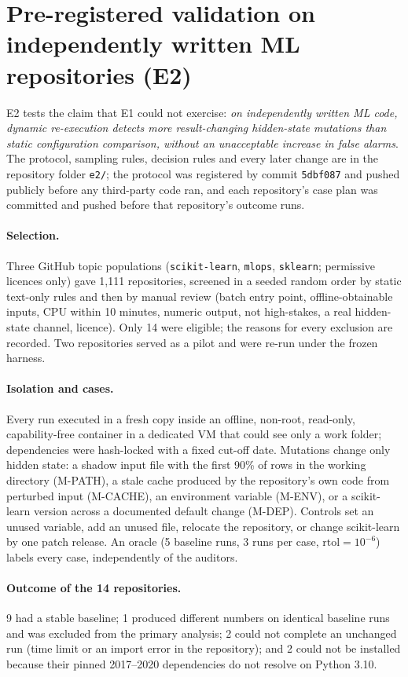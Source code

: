 
\section{Pre-registered validation on independently written ML repositories (E2)}
\label{sec:e2}
E2 tests the claim that E1 could not exercise: \emph{on independently written ML code, dynamic re-execution detects more result-changing hidden-state mutations than static configuration comparison, without an unacceptable increase in false alarms}. The protocol, sampling rules, decision rules and every later change are in the repository folder \texttt{e2/}; the protocol was registered by commit \texttt{5dbf087} and pushed publicly before any third-party code ran, and each repository's case plan was committed and pushed before that repository's outcome runs.

\paragraph{Selection.} Three GitHub topic populations (\texttt{scikit-learn}, \texttt{mlops}, \texttt{sklearn}; permissive licences only) gave 1{,}111 repositories, screened in a seeded random order by static text-only rules and then by manual review (batch entry point, offline-obtainable inputs, CPU within 10 minutes, numeric output, not high-stakes, a real hidden-state channel, licence). Only 14 were eligible; the reasons for every exclusion are recorded. Two repositories served as a pilot and were re-run under the frozen harness.

\paragraph{Isolation and cases.} Every run executed in a fresh copy inside an offline, non-root, read-only, capability-free container in a dedicated VM that could see only a work folder; dependencies were hash-locked with a fixed cut-off date. Mutations change only hidden state: a shadow input file with the first 90\% of rows in the working directory (M-PATH), a stale cache produced by the repository's own code from perturbed input (M-CACHE), an environment variable (M-ENV), or a scikit-learn version across a documented default change (M-DEP). Controls set an unused variable, add an unused file, relocate the repository, or change scikit-learn by one patch release. An oracle (5 baseline runs, 3 runs per case, $\mathrm{rtol}=10^{-6}$) labels every case, independently of the auditors.

\paragraph{Outcome of the 14 repositories.} 9 had a stable baseline; 1 produced different numbers on identical baseline runs and was excluded from the primary analysis; 2 could not complete an unchanged run (time limit or an import error in the repository); and 2 could not be installed because their pinned 2017--2020 dependencies do not resolve on Python 3.10.


